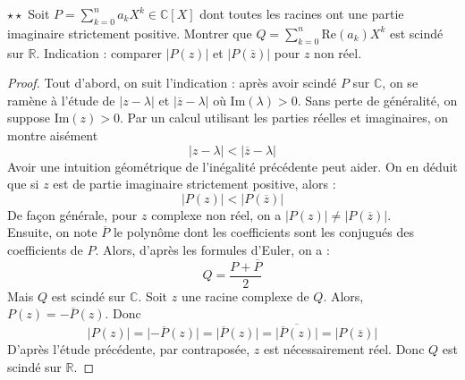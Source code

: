 \documentclass[french,a4paper]{article}
\newcommand{\R}{\mathbb{R}}
\newcommand{\C}{\mathbb{C}}
\theoremstyle{plain}
\theoremstyle{definition}
\theoremstyle{remark}
\begin{document}
\begin{ex}{$\star\star$}
	Soit $P=\displaystyle\sum_{k=0}^{n}a_kX^k\in\C[X]$ dont toutes les racines ont une partie imaginaire strictement positive. Montrer que $Q=\displaystyle\sum_{k=0}^{n}\text{Re}(a_k)X^k$ est scindé sur $\R$. Indication : comparer $\lvert P(z)\rvert$ et $\lvert P(\overline{z})\rvert$ pour $z$ non réel.
\end{ex}
\begin{proof}
	Tout d'abord, on suit l'indication : après avoir scindé $P$ sur $\C$, on se ramène à l'étude de $\lvert z-\lambda\rvert$ et $\lvert \overline{z}-\lambda\rvert$ où $\text{Im}(\lambda)>0$. Sans perte de généralité, on suppose $\text{Im}(z)>0$. Par un calcul utilisant les parties réelles et imaginaires, on montre aisément $$\lvert z-\lambda\rvert<\lvert \overline{z}-\lambda\rvert$$ Avoir une intuition géométrique de l'inégalité précédente peut aider. On en déduit que si $z$ est de partie imaginaire strictement positive, alors : $$\lvert P(z)\rvert <\lvert P(\overline{z})\rvert$$ De façon générale, pour $z$ complexe non réel, on a $\lvert P(z)\rvert \ne \lvert P(\overline{z})\rvert$. \\
	Ensuite, on note $\overline{P}$ le polynôme dont les coefficients sont les conjugués des coefficients de $P$. Alors, d'après les formules d'Euler, on a : $$Q=\frac{P+\overline{P}}{2}$$ Mais $Q$ est scindé sur $\C$. Soit $z$ une racine complexe de $Q$. Alors, $P(z)=-\overline{P}(z)$. Donc $$\lvert P(z)\rvert=\lvert -\overline{P}(z)\rvert=\lvert\overline{P}(z)\rvert=\lvert\overline{\overline{P}(z)}\rvert=\lvert P(\overline{z})\rvert$$ D'après l'étude précédente, par contraposée, $z$ est nécessairement réel. Donc $Q$ est scindé sur $\R$.
\end{proof}
\end{document}
